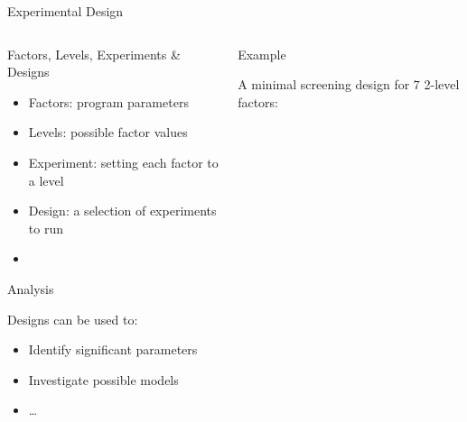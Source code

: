 \documentclass[10pt, compress, aspectratio=169, xcolor={table,usenames,dvipsnames}]{beamer}
\begin{document}
\begin{frame}[label={sec:orgdc02b4a}]{Experimental Design}
\begin{columns}
\begin{column}{0.5\columnwidth}
\begin{block}{Factors, Levels, Experiments \& Designs}
\vspace{.2cm}

\begin{itemize}
\item \alert{Factors}: program parameters
\item \alert{Levels}: possible factor values
\item \alert{Experiment}: setting each factor to a level
\item \alert{Design}: a selection of experiments to run
\item {}
\end{itemize}

\begin{block}{Analysis}
\vspace{.2cm}

Designs can be used to:

\begin{itemize}
\item Identify significant parameters
\item Investigate possible models
\item \dots{}
\end{itemize}
\end{block}
\end{block}
\end{column}

\begin{column}{0.5\columnwidth}
\begin{block}{Example}
\vspace{-.2cm}
\begin{center}

A minimal screening design for \(7\) 2-level factors:

\end{center}
\vspace{-.2cm}


\vspace{-.2cm}

\end{block}
\end{column}
\end{columns}
\end{frame}
\end{document}
